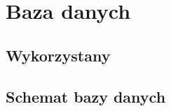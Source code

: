 \documentclass[a4paper, titlepage]{article}
\begin{document}
    
    \section{Baza danych}
    \subsection{Wykorzystany}
    \subsection{Schemat bazy danych}
    
    
\end{document}
